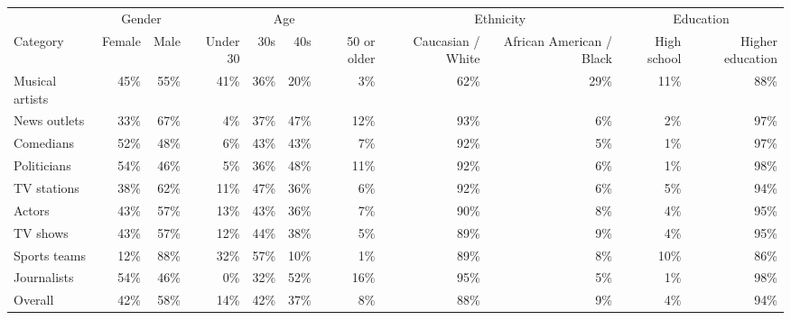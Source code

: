 \begin{tabular}{lrrrrrrrrrr}
\toprule
 & \multicolumn{2}{c}{Gender} & \multicolumn{4}{c}{Age} & \multicolumn{2}{c}{Ethnicity} & \multicolumn{2}{c}{Education} \\
Category & Female & Male & Under 30 & 30s & 40s & 50 or older & Caucasian / White & African American / Black & High school & Higher education \\
\midrule
Musical artists & 45\% & 55\% & 41\% & 36\% & 20\% & 3\% & 62\% & 29\% & 11\% & 88\% \\
News outlets & 33\% & 67\% & 4\% & 37\% & 47\% & 12\% & 93\% & 6\% & 2\% & 97\% \\
Comedians & 52\% & 48\% & 6\% & 43\% & 43\% & 7\% & 92\% & 5\% & 1\% & 97\% \\
Politicians & 54\% & 46\% & 5\% & 36\% & 48\% & 11\% & 92\% & 6\% & 1\% & 98\% \\
TV stations & 38\% & 62\% & 11\% & 47\% & 36\% & 6\% & 92\% & 6\% & 5\% & 94\% \\
Actors & 43\% & 57\% & 13\% & 43\% & 36\% & 7\% & 90\% & 8\% & 4\% & 95\% \\
TV shows & 43\% & 57\% & 12\% & 44\% & 38\% & 5\% & 89\% & 9\% & 4\% & 95\% \\
Sports teams & 12\% & 88\% & 32\% & 57\% & 10\% & 1\% & 89\% & 8\% & 10\% & 86\% \\
Journalists & 54\% & 46\% & 0\% & 32\% & 52\% & 16\% & 95\% & 5\% & 1\% & 98\% \\
\midrule
Overall & 42\% & 58\% & 14\% & 42\% & 37\% & 8\% & 88\% & 9\% & 4\% & 94\% \\
\bottomrule
\end{tabular}
